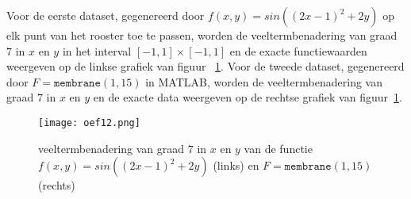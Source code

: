 Voor de eerste dataset, gegenereerd door $f(x,y)=sin((2x-1)^2+2y)$ op elk punt van het rooster toe te passen, worden de veeltermbenadering van graad $7$ in $x$ en $y$ in het interval $[-1,1]\times [-1,1]$ en de exacte functiewaarden weergeven op de linkse grafiek van figuur ~\ref{fig:oef12}. 
Voor de tweede dataset, gegenereerd door $F = \texttt{membrane}(1,15)$ in MATLAB, worden de veeltermbenadering van graad $7$ in $x$ en $y$ en de exacte data weergeven op de rechtse grafiek van figuur~\ref{fig:oef12}.

\begin{figure}[H]
    \centering
    \texttt{[image: oef12.png]}
    \caption{veeltermbenadering van graad $7$ in $x$ en $y$ van de functie $f(x,y)=sin((2x-1)^2+2y)$ (links) en $F=\texttt{membrane}(1,15)$ (rechts)}
    \label{fig:oef12}
\end{figure}